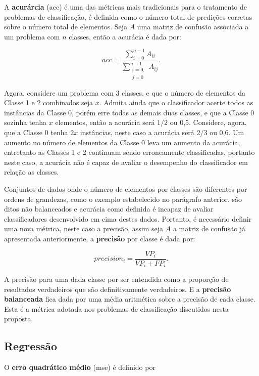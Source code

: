 A {\bf acurárcia} (acc) é uma das métricas mais tradicionais para o tratamento de problemas de classificação, é definida como o número total de predições corretas sobre o número total de elementos. Seja $A$ uma matriz de confusão associada a um problema com $n$ classes, então a acurácia é dada por:

\begin{equation}
acc=\frac{\sum_{i=0}^{n-1}A_{ii}}{\sum_{\substack{i=0,\\j=0}}^{n-1}A_{ij}}\mbox{.}
\end{equation}

Agora, considere um problema com 3 classes, e que o número de elementos da Classe 1 e 2 combinados seja $x$. Admita ainda que o classificador acerte todos as instâncias da Classe 0, porém erre todas as demais duas classes, e que a Classe 0 sozinha tenha $x$ elementos, então a acurácia será $1/2$ ou 0,5. Considere, agora, que a Classe 0 tenha $2x$ instâncias, neste caso a acurácia será $2/3$ ou 0,6. Um aumento no número de elementos da Classe 0 leva um aumento da acurácia, entretanto as Classes 1 e 2 continuam sendo erroneamente classificadas, portanto neste caso, a acurácia não é capaz de avaliar o desempenho do classificador em relação as classes.

Conjuntos de dados onde o número de elementos por classes são diferentes por ordens de grandezas, como o exemplo estabelecido no parágrafo anterior. são ditos não balanceados e acurácia como definida é incapaz de avaliar classificadores desenvolvido em cima destes dados. Portanto, é necessário definir uma nova métrica, neste caso a precisão, assim seja $A$ a matriz de confusão já apresentada anteriormente, a {\bf precisão} por classe é dada por:

\begin{equation}
precision_i=\frac{VP_i}{VP_i+FP_i}\mbox{.}
\end{equation}

A precisão para uma dada classe por ser entendida como a proporção de resultados verdadeiros que são definitivamente verdadeiros. E a {\bf precisão balanceada} fica dada por uma média aritmética sobre a precisão de cada classe. Esta é a métrica adotada nos problemas de classificação discutidos nesta proposta.

\subsection{Regressão}

O {\bf erro quadrático médio} (mse) é definido por 

